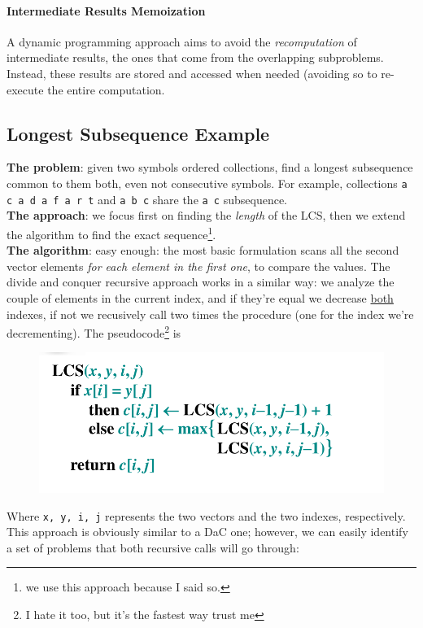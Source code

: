 \documentclass{article}
\begin{document}
		\paragraph{Intermediate Results Memoization}
			A dynamic programming approach aims to avoid the \textit{recomputation} of intermediate results, the ones that come from the overlapping subproblems. Instead, these results are stored and accessed when needed (avoiding so to re-execute the entire computation.

		\subsection{Longest Subsequence Example}
			\textbf{The problem}: given two symbols ordered collections, find a longest subsequence common to them both, even not consecutive symbols. For example, collections \verb|a c a d a f a r t| and \verb|a b c| share the \verb|a c| subsequence.\\
			\textbf{The approach}: we focus first on finding the \textit{length} of the LCS, then we extend the algorithm to find the exact sequence\footnote{we use this approach because I said so.}.\\
			\textbf{The algorithm}: easy enough: the most basic formulation scans all the second vector elements \textit{for each element in the first one}, to compare the values. The divide and conquer recursive approach works in a similar way: we analyze the couple of elements in the current index, and if they're equal we decrease \underline{both} indexes, if not we recusively call two times the procedure (one for the index we're decrementing). The pseudocode\footnote{I hate it too, but it's the fastest way trust me} is
			\begin{figure}[H]
				\centering
				\includegraphics[width = \textwidth]{./images/LCS.png}
			\end{figure}
			Where \verb|x, y, i, j| represents the two vectors and the two indexes, respectively. This approach is obviously similar to a DaC one; however, we can easily identify a set of problems that both recursive calls will go through:
\end{document}
